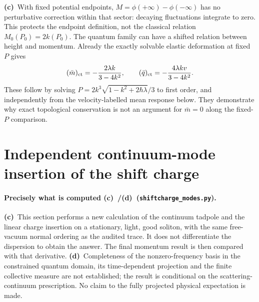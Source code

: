 \documentclass[11pt,a4paper]{article}
\newcommand{\C}{\textbf{(c)}\ }
\newcommand{\D}{\textbf{(d)}\ }
\newcommand{\file}[1]{\nolinkurl{#1}}
\newcommand{\modes}{\file{shiftcharge_modes.py}}
\begin{document}
\C With fixed potential endpoints, $M=\phi(+\infty)-\phi(-\infty)$ has no
perturbative correction within that sector: decaying fluctuations integrate
to zero. This protects the endpoint definition, not the classical relation
$M_0(P_0)=2k(P_0)$. The quantum family can have a shifted relation between
height and momentum. Already the exactly solvable elastic deformation at
fixed $P$ gives
\begin{equation}
 (\bar m)_{\rm ct}=-\frac{2\lambda k}{3-4k^2},\qquad
 (\bar q)_{\rm ct}=-\frac{4\lambda kv}{3-4k^2}.\label{CTcharges}
\end{equation}
These follow by solving $P=2k^3\sqrt{1-k^2+2\hbar\lambda}/3$ to first
order, and independently from the velocity-labelled mean response below.
They demonstrate why exact topological conservation is not an argument for
$\bar m=0$ along the fixed-$P$ comparison.

\section{Independent continuum-mode insertion of the shift charge}
\paragraph{Precisely what is computed \C/\D (\modes).}
\C This section performs a new calculation of the continuum tadpole and the
linear charge insertion on a stationary, light, good soliton, with the same
free-vacuum normal ordering as the audited trace. It does not differentiate
the dispersion to obtain the answer. The final momentum result is then
compared with that derivative. \D Completeness of the nonzero-frequency
basis in the constrained quantum domain, its time-dependent projection and
the finite collective measure are not established; the result is conditional
on the scattering-continuum prescription. No claim to the fully projected
physical expectation is made.
\end{document}
